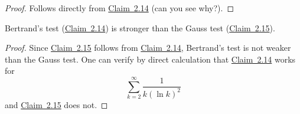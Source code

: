 \begin{proof}
Follows directly from \hyperref[claim:2.14]{Claim~2.14} (can you see why?).
\end{proof}

\begin{claim}\label{claim:2.16}
Bertrand's test (\hyperref[claim:2.14]{Claim~2.14}) is stronger than the Gauss test (\hyperref[claim:2.15]{Claim~2.15}).
\end{claim}

\begin{proof}
Since \hyperref[claim:2.15]{Claim~2.15} follows from \hyperref[claim:2.14]{Claim~2.14}, Bertrand's test is not weaker than the Gauss test. One can verify by direct calculation that \hyperref[claim:2.14]{Claim~2.14} works for
\[
\sum_{k=2}^{\infty}\frac1{k(\ln k)^2}
\]
and \hyperref[claim:2.15]{Claim~2.15} does not.
\end{proof}
